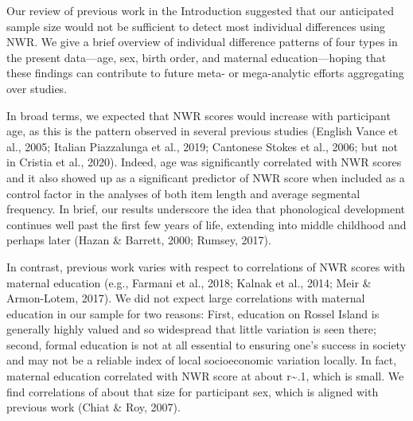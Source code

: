\documentclass[
  american,
  ,man,floatsintext]{apa6}
\begin{document}
Our review of previous work in the Introduction suggested that our anticipated sample size would not be sufficient to detect most individual differences using NWR. We give a brief overview of individual difference patterns of four types in the present data---age, sex, birth order, and maternal education---hoping that these findings can contribute to future meta- or mega-analytic efforts aggregating over studies.

In broad terms, we expected that NWR scores would increase with participant age, as this is the pattern observed in several previous studies (English Vance et al., 2005; Italian Piazzalunga et al., 2019; Cantonese Stokes et al., 2006; but not in Cristia et al., 2020). Indeed, age was significantly correlated with NWR scores and it also showed up as a significant predictor of NWR score when included as a control factor in the analyses of both item length and average segmental frequency. In brief, our results underscore the idea that phonological development continues well past the first few years of life, extending into middle childhood and perhaps later (Hazan \& Barrett, 2000; Rumsey, 2017).

In contrast, previous work varies with respect to correlations of NWR scores with maternal education (e.g., Farmani et al., 2018; Kalnak et al., 2014; Meir \& Armon-Lotem, 2017). We did not expect large correlations with maternal education in our sample for two reasons: First, education on Rossel Island is generally highly valued and so widespread that little variation is seen there; second, formal education is not at all essential to ensuring one's success in society and may not be a reliable index of local socioeconomic variation locally. In fact, maternal education correlated with NWR score at about r\textasciitilde.1, which is small. We find correlations of about that size for participant sex, which is aligned with previous work (Chiat \& Roy, 2007).
\end{document}
